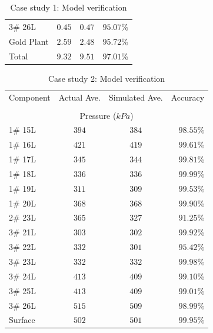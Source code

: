 \begin{appendices}
\begin{table}[h!]
\begin{tabular}{lccr}
		3\# 26L  & $ 0.45 $ & $ 0.47 $ & $ 95.07 $\% \\
		Gold Plant & $ 2.59 $ & $ 2.48 $ & $ 95.72 $\% \\
		Total  	 & $ 9.32$  & $9.51 $  & $ 97.01 $\% \\
		\hline 
	\end{tabular}
		\caption{Case study 1: Model verification}
		\label{Table: A verification}
	\end{table}
\begin{table}[h!]
		\centering
		\begin{tabular}{lccr}
			\hline 
			Component & Actual Ave. & Simulated  Ave. & Accuracy \\ \hhline{====} 
			\\
		\multicolumn{4}{c}{Pressure ($ kPa $)}
		\\
		1\# 15L  & $ 394 $ & $ 384 $ & $ 98.55 $\% \\
		1\# 16L  & $ 421 $ & $ 419 $ & $ 99.61 $\% \\
		1\# 17L  & $ 345 $ & $ 344 $ & $ 99.81 $\% \\
		1\# 18L  & $ 336 $ & $ 336 $ & $ 99.99 $\% \\
		1\# 19L  & $ 311 $ & $ 309 $ & $ 99.53 $\% \\
		1\# 20L  & $ 368 $ & $ 368 $ & $ 99.90 $\% \\
		2\# 23L  & $ 365 $ & $ 327 $ & $ 91.25 $\% \\
		3\# 21L  & $ 303 $ & $ 302 $ & $ 99.92 $\% \\
		3\# 22L  & $ 332 $ & $ 301 $ & $ 95.42 $\% \\
		3\# 23L  & $ 332 $ & $ 332 $ & $ 99.98 $\% \\
		3\# 24L  & $ 413 $ & $ 409 $ & $ 99.10 $\% \\
		3\# 25L  & $ 413 $ & $ 409 $ & $ 99.01 $\% \\
		3\# 26L  & $ 515 $ & $ 509 $ & $ 98.99 $\% \\
		Surface & $ 502 $ & $ 501 $ & $ 99.95 $\% \\
		\hline 
	\end{tabular}
\caption{Case study 2: Model verification}
\label{Table: A verification2}
\end{table}


\end{appendices}
